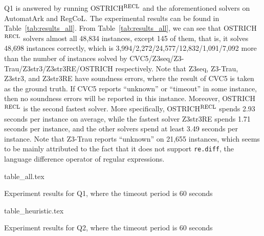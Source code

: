 Q1 is answered by running OSTRICH$^{\rm RECL}$ and the aforementioned solvers on AutomatArk and RegCoL. The experimental results can be found in Table~\ref{tab:results_all}. From Table~\ref{tab:results_all}, we can see that OSTRICH$^{\rm RECL}$ solvers almost all 48,834 instances, except 145 of them, that is, it solves 48,698 instances correctly, which is 3,994/2,272/24,577/12,832/1,091/7,092 more than the number of instances solved by CVC5/Z3seq/Z3-Trau/Z3str3/Z3str3RE/OSTRICH respectively. 
%    
Note that Z3seq, Z3-Trau, Z3str3, and Z3str3RE have soundness errors, where the result of CVC5 is taken as the ground truth. If CVC5 reports ``unknown'' or ``timeout'' in some instance, then no soundness errors will be reported in this instance. 
%
Moreover, OSTRICH$^{\rm RECL}$ is the second fastest solver. More specifically, OSTRICH$^{\rm RECL}$ spends 2.93 seconds per instance on average, while the fastest solver Z3str3RE spends 1.71 seconds per instance, and the other solvers spend at least 3.49 seconds per instance.  
Note that Z3-Trau reports ``unknown'' on 21,655 instances, which seems to be mainly attributed to the fact that it does not support \verb|re.diff|, the language difference operator of regular expressions. 


\begin{table}[t]
\vspace{-1mm}
\begin{center}
  {table_all.tex}
\end{center}
  \caption{Experiment results for Q1, where the timeout period is 60 seconds}
  \label{tab:results_all}
\vspace{-5mm}
\end{table}


\begin{table}[ht]
\vspace{-3mm}
\begin{center}
  {table_heuristic.tex}
\end{center}
  \caption{Experiment results for Q2, where the timeout period is 60 seconds}
  \label{tab:results_heuristics}
\vspace{-5mm}
\end{table}

